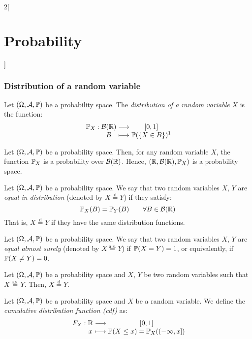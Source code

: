\documentclass[../../../main.tex]{subfiles}
\begin{document}
\begin{multicols}{2}[\section{Probability}]
    \subsubsection{Distribution of a random variable}
    \begin{definition}
        Let $(\Omega,\mathcal{A},\mathbb{P})$ be a probability space. The \textit{distribution of a random variable} $X$ is the function:
        $$
            \function{\Prob_X}{\mathcal{B}(\RR)}{[0,1]}{B}{\Prob(\{X\in B\})\footnotemark}
        $$
    \end{definition}
    \begin{prop}
        Let $(\Omega,\mathcal{A},\mathbb{P})$ be a probability space. Then, for any random variable $X$, the function $\mathbb{P}_X$ is a probability over $\mathcal{B}(\mathbb{R})$. Hence, $(\mathbb{R},\mathcal{B}(\mathbb{R}),\mathbb{P}_X)$ is a probability space.
    \end{prop}
    \begin{definition}
        Let $(\Omega,\mathcal{A},\mathbb{P})$ be a probability space. We say that two random variables $X$, $Y$ are \textit{equal in distribution} (denoted by $X\overset{\text{d}}{=}Y$) if they satisfy: $$\mathbb{P}_X(B)=\mathbb{P}_Y(B)\qquad\forall B\in\mathcal{B}(\mathbb{R})$$ That is, $X\overset{\text{d}}{=}Y$ if they have the same distribution functions.
    \end{definition}
    \begin{definition}
        Let $(\Omega,\mathcal{A},\mathbb{P})$ be a probability space. We say that two random variables $X$, $Y$ are \textit{equal almost surely} (denoted by $X\overset{\text{a.s.}}{=}Y$) if $\mathbb{P}(X=Y)=1$, or equivalently, if $\mathbb{P}(X\ne Y)=0$.
    \end{definition}
    \begin{prop}
        Let $(\Omega,\mathcal{A},\mathbb{P})$ be a probability space and $X$, $Y$ be two random variables such that $X\overset{\text{a.s.}}{=}Y$. Then, $X\overset{\text{d}}{=}Y$.
    \end{prop}
    \begin{definition}
        Let $(\Omega,\mathcal{A},\mathbb{P})$ be a probability space and $X$ be a random variable. We define the \textit{cumulative distribution function (cdf)} as:
        $$
            \function{F_X}{\RR}{[0,1]}{x}{\Prob(X\leq x)=\Prob_X((-\infty,x])}
        $$
    \end{definition}
    \begin{theorem}

\end{theorem}
\end{multicols}
\end{document}
